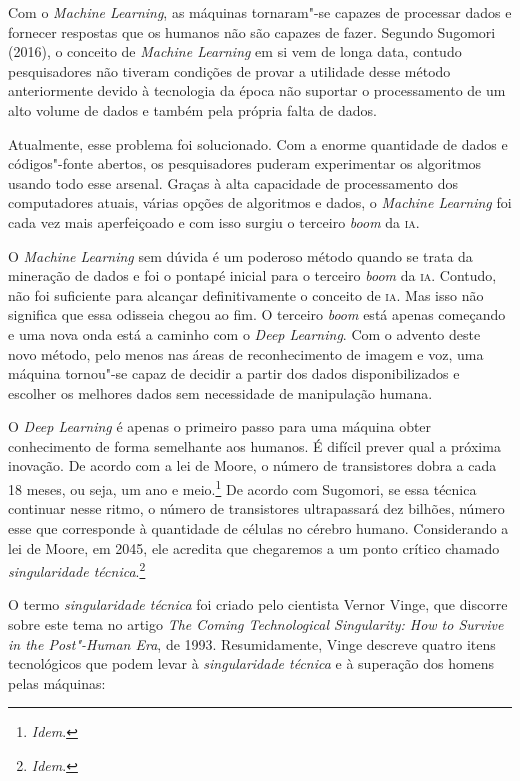 Com o \textit{Machine Learning}, as máquinas tornaram"-se capazes de
processar dados e fornecer respostas que os humanos não são capazes de
fazer. Segundo Sugomori (2016), o conceito de \textit{Machine Learning} em
si vem de longa data, contudo pesquisadores não tiveram condições de
provar a utilidade desse método anteriormente devido à tecnologia da
época não suportar o processamento de um alto volume de dados e também
pela própria falta de dados.

Atualmente, esse problema foi solucionado. Com a enorme quantidade de
dados e códigos"-fonte abertos, os pesquisadores puderam experimentar os
algoritmos usando todo esse arsenal. Graças à alta capacidade de
processamento dos computadores atuais, várias opções de algoritmos e
dados, o \textit{Machine Learning} foi cada vez mais aperfeiçoado e com
isso surgiu o terceiro \textit{boom} da \textsc{ia}.

O \textit{Machine Learning} sem dúvida é um poderoso método quando se
trata da mineração de dados e foi o pontapé inicial para o terceiro
\textit{boom} da \textsc{ia}. Contudo, não foi suficiente para alcançar
definitivamente o conceito de \textsc{ia}. Mas isso não significa que essa
odisseia chegou ao fim. O terceiro \textit{boom} está apenas começando e uma nova
onda está a caminho com o \textit{Deep Learning}. Com o advento deste novo
método, pelo menos nas áreas de reconhecimento de imagem e voz, uma
máquina tornou"-se capaz de decidir a partir dos dados disponibilizados e
escolher os melhores dados sem necessidade de manipulação humana.

O \textit{Deep Learning} é apenas o primeiro passo para uma máquina obter
conhecimento de forma semelhante aos humanos. É difícil prever qual a
próxima inovação. De acordo com a lei de Moore, o número de transistores
dobra a cada 18 meses, ou seja, um ano e meio.\footnote{\textit{Idem}.} De
acordo com Sugomori, se essa técnica continuar nesse ritmo, o número de
transistores ultrapassará dez bilhões, número esse que corresponde à
quantidade de células no cérebro humano. Considerando a lei de Moore, em
2045, ele acredita que chegaremos a um ponto crítico chamado
\textit{singularidade técnica}.\footnote{\textit{Idem}.}

O termo \textit{singularidade técnica} foi criado pelo cientista Vernor
Vinge, que discorre sobre este tema no artigo \textit{The Coming
Technological Singularity: How to Survive in the Post"-Human Era}, de 1993.
Resumidamente, Vinge descreve quatro itens tecnológicos
que podem levar à \textit{singularidade técnica} e à superação dos homens
pelas máquinas:


